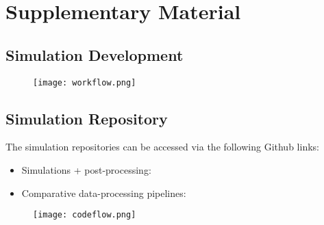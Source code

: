\chapter{Supplementary Material} \label{c:supple}
\section{Simulation Development} \label{s:devel}
\begin{figure}[!h]
	\centering
	\texttt{[image: workflow.png]}
	\label{f:workflow}
\end{figure}

\clearpage
\section{Simulation Repository} \label{s:github}
The simulation repositories can be accessed via the following Github links:
\begin{itemize}[noitemsep]
	\item Simulations + post-processing: 
	\item Comparative data-processing pipelines:
\end{itemize}

\begin{figure}[!h] \centering
	\texttt{[image: codeflow.png]}
\end{figure}

\clearpage
